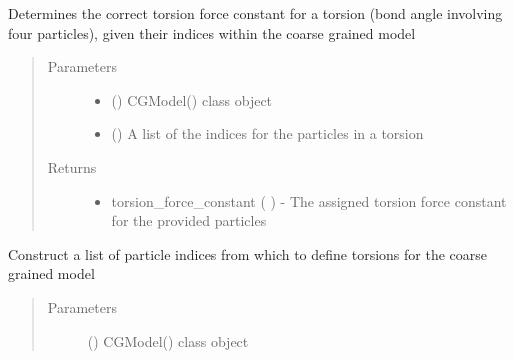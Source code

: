 \documentclass[letterpaper,12pt,english,openany,oneside]{sphinxmanual}
\begin{document}
\begin{fulllineitems}
\begin{fulllineitems}
\label{\detokenize{cg_model:cg_model.cgmodel.CGModel.get_torsion_force_constant}}
Determines the correct torsion force constant for a torsion (bond angle involving four particles), given their indices within the coarse grained model
\begin{quote}\begin{description}
\item[{Parameters}] \leavevmode\begin{itemize}
\item {} 
 () \textendash{} CGModel() class object

\item {} 
 (\sphinxstyleliteralemphasis{\sphinxupquote{( }}\sphinxstyleliteralemphasis{\sphinxupquote{ )}}) \textendash{} A list of the indices for the particles in a torsion

\end{itemize}

\item[{Returns}] \leavevmode
\begin{itemize}
\item {} 
torsion\_force\_constant (  ) - The assigned torsion force constant for the provided particles

\end{itemize}


\end{description}\end{quote}

\end{fulllineitems}


\begin{fulllineitems}
\label{\detokenize{cg_model:cg_model.cgmodel.CGModel.get_torsion_list}}
Construct a list of particle indices from which to define torsions for the coarse grained model
\begin{quote}\begin{description}
\item[{Parameters}] \leavevmode
{} () \textendash{} CGModel() class object


\end{description}
\end{quote}
\end{fulllineitems}
\end{fulllineitems}
\end{document}
